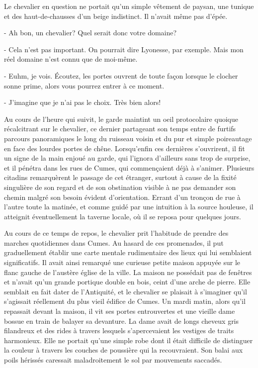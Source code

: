 \documentclass[a4paper,11pt, openany]{book}
\begin{document}
Le chevalier en question ne portait qu'un simple vêtement de paysan, une tunique et des haut-de-chausses d'un beige indistinct. Il n'avait même pas d'épée.

- Ah bon, un chevalier? Quel serait donc votre domaine?

- Cela n'est pas important. On pourrait dire Lyonesse, par exemple. Mais mon réel domaine n'est connu que de moi-même.

- Euhm, je vois. Écoutez, les portes ouvrent de toute façon lorsque le clocher sonne prime, alors vous pourrez entrer à ce moment.

- J'imagine que je n'ai pas le choix. Très bien alors!

Au cours de l'heure qui suivit, le garde maintint un oeil protocolaire quoique récalcitrant sur le chevalier, ce dernier partageant son temps entre de furtifs parcours panoramiques le long du ruisseau voisin et du pur et simple poireautage en face des lourdes portes de chêne.
Lorsqu'enfin ces dernières s'ouvrirent, il fit un signe de la main enjoué au garde, qui l'ignora d'ailleurs sans trop de surprise, et il pénétra dans les rues de Cumes, qui commençaient déjà à s'animer.
Plusieurs citadins remarquèrent le passage de cet étranger, surtout à cause de la fixité singulière de son regard et de son obstination visible à ne pas demander son chemin malgré son besoin évident d'orientation.
Errant d'un tronçon de rue à l'autre toute la matinée, et comme guidé par une intuition à la source houleuse, il atteignit éventuellement la taverne locale, où il se reposa pour quelques jours.

Au cours de ce temps de repos, le chevalier prit l'habitude de prendre des marches quotidiennes dans Cumes. Au hasard de ces promenades, il put graduellement établir une carte mentale rudimentaire des lieux qui lui semblaient significatifs. 
Il avait ainsi remarqué une curieuse petite maison appuyée sur le flanc gauche de l'austère église de la ville. La maison ne possédait pas de fenêtres et n'avait qu'un grande portique double en bois, ceint d'une arche de pierre. Elle semblait en fait dater de l'Antiquité,
et le chevalier se plaisait à s'imaginer qu'il s'agissait réellement du plus vieil édifice de Cumes. Un mardi matin, alors qu'il repassait devant la maison, il vit ses portes entrouvertes et une vieille dame bossue en train de balayer sa devanture.
La dame avait de longs cheveux gris filandreux et des rides à travers lesquels s'apercevaient les vestiges de traits harmonieux. Elle ne portait qu'une simple robe dont il était difficile de distinguer la couleur à travers les couches de poussière qui la recouvraient. 
Son balai aux poils hérissés caressait maladroitement le sol par mouvements saccadés.
\end{document}
